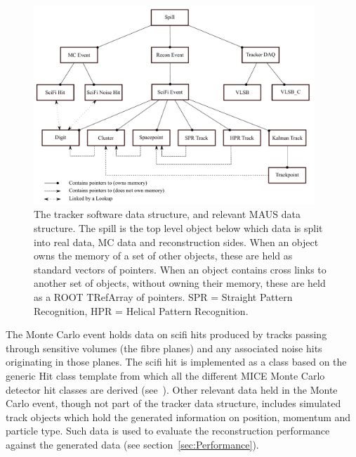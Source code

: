 \begin{figure}[bt]
  \begin{center}
    \includegraphics[width=25pc]{04-DataStructure/DataStructureSimple2014.pdf}
    \caption{\label{figureDataStructure}The tracker software data structure, and relevant MAUS data structure.  The spill is the top level object below which data is split into real data, MC data and reconstruction sides. When an object owns the memory of a set of other objects, these are held as standard vectors of pointers. When an object contains cross links to another set of objects, without owning their memory, these are held as a ROOT TRefArray of pointers. SPR = Straight Pattern Recognition, HPR = Helical Pattern Recognition.}
  \end{center}
\end{figure}

The Monte Carlo event holds data on scifi hits produced by tracks passing through sensitive volumes (the fibre planes) and any associated noise hits originating in those planes. The scifi hit is implemented as a class based on the generic Hit class template from which all the different MICE Monte Carlo detector hit classes are derived (see~\cite{MausPaper}).  Other relevant data held in the Monte Carlo event, though not part of the tracker data structure, includes simulated track objects which hold the generated information on position, momentum and particle type.  Such data is used to evaluate the reconstruction performance against the generated data (see section~\ref{sec:Performance}).

